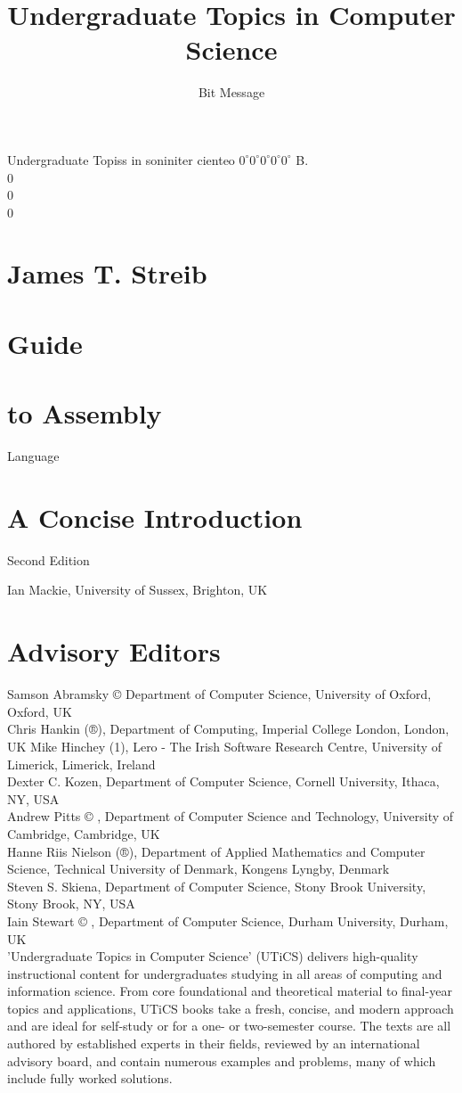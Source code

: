 \documentclass[10pt]{article}
\title{Undergraduate Topics in Computer Science }
\author{Bit Message}
\date{}
\begin{document}
\maketitle
Undergraduate Topiss in soniniter cienteo $0^{\circ} 0^{\circ} 0^{\circ} 0^{\circ} 0^{\circ}$ B.\\
0\\
0\\
0

\section*{James T. Streib}
\section*{Guide}
\section*{to Assembly}
 Language\section*{A Concise Introduction}
Second Edition

Ian Mackie, University of Sussex, Brighton, UK

\section*{Advisory Editors}
Samson Abramsky © Department of Computer Science, University of Oxford, Oxford, UK\\
Chris Hankin (®), Department of Computing, Imperial College London, London, UK Mike Hinchey (1), Lero - The Irish Software Research Centre, University of Limerick, Limerick, Ireland\\
Dexter C. Kozen, Department of Computer Science, Cornell University, Ithaca, NY, USA\\
Andrew Pitts © , Department of Computer Science and Technology, University of Cambridge, Cambridge, UK\\
Hanne Riis Nielson (®), Department of Applied Mathematics and Computer Science, Technical University of Denmark, Kongens Lyngby, Denmark\\
Steven S. Skiena, Department of Computer Science, Stony Brook University, Stony Brook, NY, USA\\
Iain Stewart © , Department of Computer Science, Durham University, Durham, UK\\
'Undergraduate Topics in Computer Science' (UTiCS) delivers high-quality instructional content for undergraduates studying in all areas of computing and information science. From core foundational and theoretical material to final-year topics and applications, UTiCS books take a fresh, concise, and modern approach and are ideal for self-study or for a one- or two-semester course. The texts are all authored by established experts in their fields, reviewed by an international advisory board, and contain numerous examples and problems, many of which include fully worked solutions.
\end{document}
